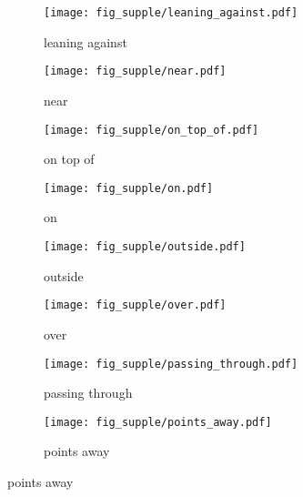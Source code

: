 \documentclass{article}
\begin{document}
\begin{figure}[h]
\begin{subfigure}{0.22\linewidth}
\texttt{[image: fig\_supple/leaning\_against.pdf]}
\caption{leaning against}
\end{subfigure}
\begin{subfigure}{0.22\linewidth}
\texttt{[image: fig\_supple/near.pdf]}
\caption{near}
\end{subfigure}
\begin{subfigure}{0.22\linewidth}
\texttt{[image: fig\_supple/on\_top\_of.pdf]}
\caption{on top of}
\end{subfigure}
\begin{subfigure}{0.22\linewidth}
\texttt{[image: fig\_supple/on.pdf]}
\caption{on}
\end{subfigure}
\begin{subfigure}{0.22\linewidth}
\texttt{[image: fig\_supple/outside.pdf]}
\caption{outside}
\end{subfigure}
\begin{subfigure}{0.22\linewidth}
\texttt{[image: fig\_supple/over.pdf]}
\caption{over}
\end{subfigure}
\begin{subfigure}{0.22\linewidth}
\texttt{[image: fig\_supple/passing\_through.pdf]}
\caption{passing through}
\end{subfigure}
\begin{subfigure}{0.22\linewidth}
\texttt{[image: fig\_supple/points\_away.pdf]}
\caption{points away}
\end{subfigure}

\end{figure}
\end{document}
